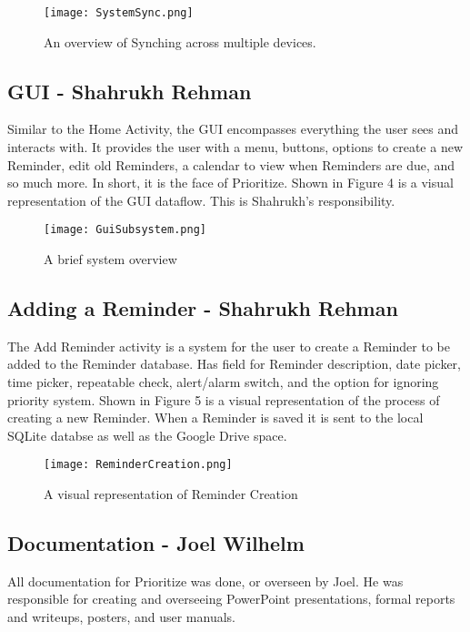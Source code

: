 \documentclass[12pt]{article}
\begin{document}
\begin{figure}[h]
\texttt{[image: SystemSync.png]}
\centering
\caption{An overview of Synching across multiple devices.}
\end{figure}






\subsection{GUI - Shahrukh Rehman}
Similar to the Home Activity, the GUI encompasses everything the user sees and interacts with. It provides the user with a menu, buttons, options to create a new Reminder, edit old Reminders, a calendar to view when Reminders are due, and so much more. In short, it is the face of Prioritize. Shown in Figure 4 is a visual representation of the GUI dataflow. This is Shahrukh's responsibility.

\begin{figure}[h]
\texttt{[image: GuiSubsystem.png]}
\centering
\caption{A brief system overview}
\end{figure}

\subsection{Adding a Reminder - Shahrukh Rehman}
The Add Reminder activity is a system for the user to create a Reminder to be added to the Reminder database. Has field for Reminder description, date picker, time picker, repeatable check, alert/alarm switch, and the option for ignoring priority system. Shown in Figure 5 is a visual representation of the process of creating a new Reminder. When a Reminder is saved it is sent to the local SQLite databse as well as the Google Drive space. 

\begin{figure}[h]
\texttt{[image: ReminderCreation.png]}
\centering
\caption{A visual representation of Reminder Creation}
\end{figure}

\subsection{Documentation - Joel Wilhelm}
All documentation for Prioritize was done, or overseen by Joel. He was responsible for creating and overseeing PowerPoint presentations, formal reports and writeups, posters, and user manuals. 
\end{document}
